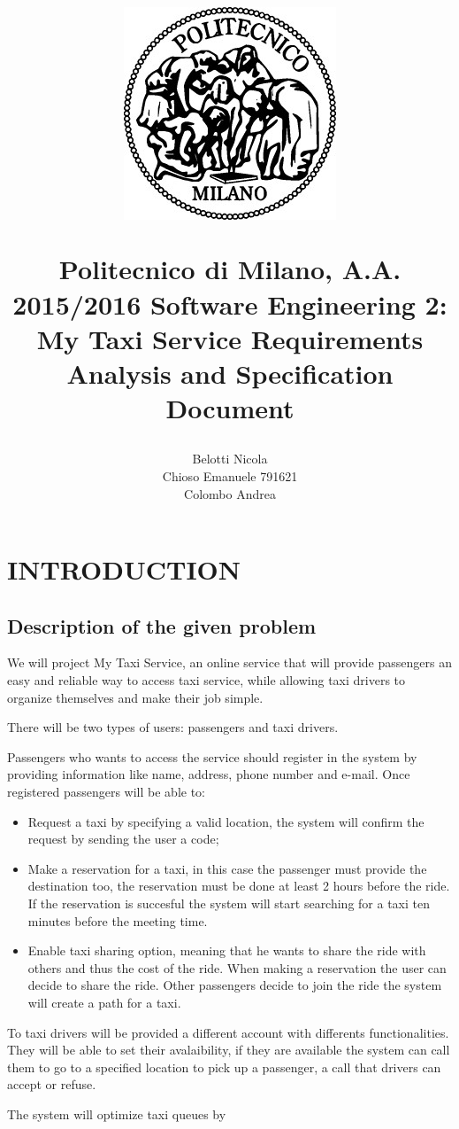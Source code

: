 \documentclass[a4paper, 12pt, titlepage]{article}
\title{
	\begin{figure}[h]
		\centering
		\includegraphics{polimi_logo}
	\end{figure}
	Politecnico di Milano, A.A. 2015/2016 
	\newline\newline 
	Software Engineering 2: My Taxi Service 
	\textbf{R}equirements \textbf{A}nalysis and \textbf{S}pecification \textbf{D}ocument}
\author{Belotti Nicola\\ Chioso Emanuele 791621\\ Colombo Andrea}
\begin{document}
\maketitle
\tableofcontents
\newpage

\section{INTRODUCTION}
\subsection{Description of the given problem}

We will project My Taxi Service, an online service that will provide passengers an easy and reliable way to access taxi service, while allowing taxi drivers to organize themselves and make their job simple.

There will be two types of users: passengers and taxi drivers.

Passengers who wants to access the service should register in the system by providing information like name, address, phone number and e-mail. 
Once registered passengers will be able to: 
\begin{itemize}
	\item Request a taxi by specifying a valid location, the system will confirm the request by sending the user a code;
	\item Make a reservation for a taxi, in this case the passenger must provide the destination too, the reservation must be done at least 2 hours before the ride. If the reservation is succesful the system will start searching for a taxi ten minutes before the meeting time.
	\item Enable taxi sharing option, meaning that he wants to share the ride with others and thus the cost of the ride. When making a reservation the user can decide to share the ride. Other passengers decide to join the ride the system will create a path for a taxi.
\end{itemize}

To taxi drivers will be provided a different account with differents functionalities. They will be able to set their avalaibility, if they are available the system can call them to go to a specified location to pick up a passenger, a call that drivers can accept or refuse.

The system will optimize taxi queues by 
\end{document}
